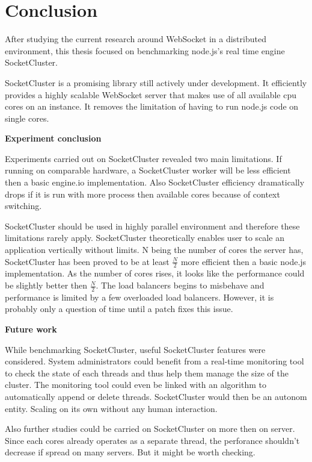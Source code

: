 
\chapter{Conclusion} 
\label{Chapter4} 

After studying the current research around WebSocket in a distributed
environment, this thesis focused on benchmarking node.js's real time
engine SocketCluster.

SocketCluster is a promising library still actively under development.
It efficiently provides a highly scalable WebSocket server that makes
use of all available cpu cores on an instance. It removes the limitation
of having to run node.js code on single cores.

\textbf{Experiment conclusion}

Experiments carried out on SocketCluster revealed two main limitations.  If
running on comparable hardware, a SocketCluster worker will be less efficient
then a basic engine.io implementation. Also SocketCluster efficiency
dramatically drops if it is run with more process then available cores because
of context switching.

SocketCluster should be used in highly parallel environment and
therefore these limitations rarely apply. SocketCluster theoretically  enables
user to scale an application vertically  without limits. N being the number of
cores the server has, SocketCluster has been proved to be at least
$\frac{N}{2}$ more efficient then a basic node.js implementation.  As the
number of cores rises, it looks like the performance could be slightly better
then $\frac{N}{2}$. The load balancers begins to misbehave and performance
is limited by a few overloaded load balancers. However, it is probably only a
question of time until a patch fixes this issue.

\newpage
\textbf{Future work}

While benchmarking SocketCluster, useful SocketCluster features were
considered.  System administrators could benefit from a real-time monitoring tool
to check the state of each threads and thus help them manage the size of the
cluster. The monitoring tool could even be linked with an algorithm to
automatically append or delete threads.  SocketCluster would then be an autonom
entity. Scaling on its own without any human interaction.

Also further studies could be carried on SocketCluster on more then on server.
Since each cores already operates as a separate thread, the perforance
shouldn't decrease if spread on many servers. But it might be worth checking.
















